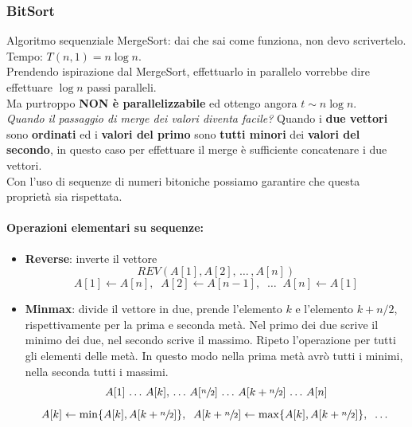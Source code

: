 \documentclass[11pt]{article}
\begin{document}
	\newpage
	
	\subsubsection{BitSort}
	
	Algoritmo sequenziale MergeSort: dai che sai come funziona, non devo scrivertelo. Tempo: $T(n, 1) = n \log n$.\\
	
	Prendendo ispirazione dal MergeSort, effettuarlo in parallelo vorrebbe dire effettuare $\log n$ passi paralleli.\\
	
	Ma purtroppo \textbf{NON è parallelizzabile} ed ottengo angora $t \sim n \log n$.\\
	
	\textit{Quando il passaggio di merge dei valori diventa facile?} Quando i \textbf{due vettori} sono \textbf{ordinati} ed i \textbf{valori del primo} sono \textbf{tutti minori} dei \textbf{valori del secondo}, in questo caso per effettuare il merge è sufficiente concatenare i due vettori.\\
	
	Con l'uso di sequenze di numeri bitoniche possiamo garantire che questa proprietà sia rispettata.\\
	
	\paragraph{Operazioni elementari su sequenze: }
	\begin{itemize}
		\item \textbf{Reverse}: inverte il vettore
		$$ REV(A[1], A[2], \, \dots \, , A[n]) $$
		$$ A[1] \leftarrow A[n], \;\; A[2] \leftarrow A[n-1], \;\; \dots \;\; A[n] \leftarrow A[1] $$
		
		\item \textbf{Minmax}: divide il vettore in due, prende l'elemento $k$ e l'elemento $k + n/2$, rispettivamente per la prima e seconda metà. Nel primo dei due scrive il minimo dei due, nel secondo scrive il massimo. Ripeto l'operazione per tutti gli elementi delle metà. In questo modo nella prima metà avrò tutti i minimi, nella seconda tutti i massimi. 
		$$ A[1] \, \dots \, A[k], \, \dots \, A[\sfrac{n}{2}] \, \dots \, A[k + \sfrac{n}{2}] \, \dots \, A[n]$$
		 $$ A[k] \leftarrow \min \{A[k], A[k + \sfrac{n}{2}]\}, \;\; A[k + \sfrac{n}{2}] \leftarrow \max \{A[k], A[k + \sfrac{n}{2}]\}, \;\; \dots $$
	\end{itemize}
	
\end{document}
